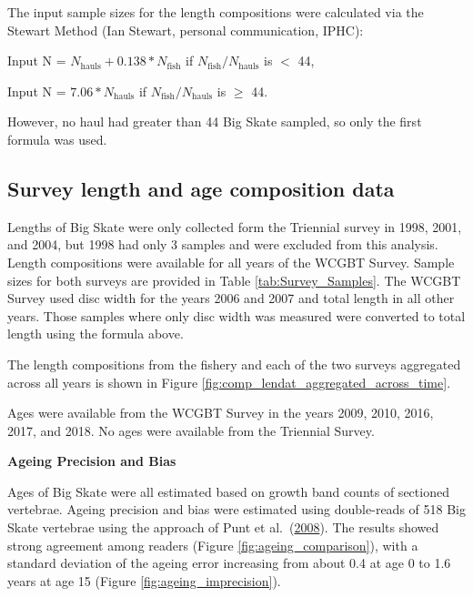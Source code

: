 \documentclass[12pt,]{article}
\begin{document}
The input sample sizes for the length compositions were calculated via
the Stewart Method (Ian Stewart, personal communication, IPHC):

\begin{centering}

Input N = $N_{\text{hauls}} + 0.138 * N_{\text{fish}}$ if $N_{\text{fish}}/N_{\text{hauls}}$ is $<$ 44,

Input N = $7.06 * N_{\text{hauls}}$ if $N_{\text{fish}}/N_{\text{hauls}}$ is $\geq$ 44.

\end{centering}

However, no haul had greater than 44 Big Skate sampled, so only the
first formula was used.

\hypertarget{survey-length-and-age-composition-data}{%
\subsection{Survey length and age composition
data}\label{survey-length-and-age-composition-data}}

Lengths of Big Skate were only collected form the Triennial survey in
1998, 2001, and 2004, but 1998 had only 3 samples and were excluded from
this analysis. Length compositions were available for all years of the
WCGBT Survey. Sample sizes for both surveys are provided in Table
\ref{tab:Survey_Samples}. The WCGBT Survey used disc width for the years
2006 and 2007 and total length in all other years. Those samples where
only disc width was measured were converted to total length using the
formula above.

The length compositions from the fishery and each of the two surveys
aggregated across all years is shown in Figure
\ref{fig:comp_lendat_aggregated_across_time}.

Ages were available from the WCGBT Survey in the years 2009, 2010, 2016,
2017, and 2018. No ages were available from the Triennial Survey.

\vspace{.5cm}

\textbf{Ageing Precision and Bias}

Ages of Big Skate were all estimated based on growth band counts of
sectioned vertebrae. Ageing precision and bias were estimated using
double-reads of 518 Big Skate vertebrae using the approach of Punt et
al.~(\protect\hyperlink{ref-Punt2008}{2008}). The results showed strong
agreement among readers (Figure \ref{fig:ageing_comparison}), with a
standard deviation of the ageing error increasing from about 0.4 at age
0 to 1.6 years at age 15 (Figure \ref{fig:ageing_imprecision}).
\end{document}
